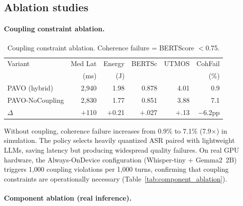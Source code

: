 \documentclass{article}
\begin{document}
\subsection{Ablation studies}

\paragraph{Coupling constraint ablation.}

\begin{table}[t]
\centering
\caption{Coupling constraint ablation. Coherence failure = BERTScore $<$0.75.}
\label{tab:ablation_coupling}
\small
\begin{tabular}{lrrrrr}
\toprule
Variant & Med Lat & Energy & BERTSc & UTMOS & CohFail \\
 & (ms) & (J) & & & (\%) \\
\midrule
PAVO (hybrid) & 2{,}940 & 1.98 & 0.878 & 4.01 & 0.9 \\
PAVO-NoCoupling & 2{,}830 & 1.77 & 0.851 & 3.88 & 7.1 \\
\midrule
$\Delta$ & $+$110 & $+$0.21 & $+$.027 & $+$.13 & $-$6.2pp \\
\bottomrule
\end{tabular}
\end{table}

Without coupling, coherence failure increases from 0.9\% to 7.1\% (7.9$\times$) in simulation. The policy selects heavily quantized ASR paired with lightweight LLMs, saving latency but producing widespread quality failures. On real GPU hardware, the Always-OnDevice configuration (Whisper-tiny + Gemma2~2B) triggers 1{,}000 coupling violations per 1{,}000 turns, confirming that coupling constraints are operationally necessary (Table~\ref{tab:component_ablation}).

\paragraph{Component ablation (real inference).}
\end{document}
